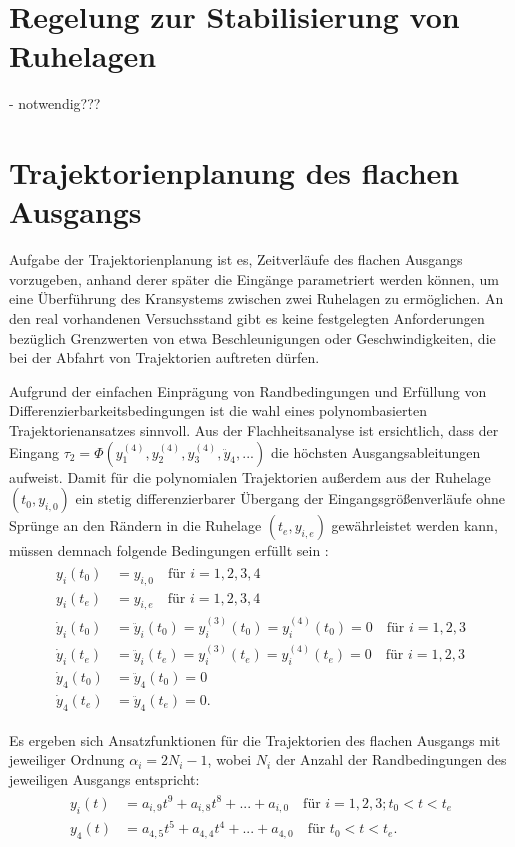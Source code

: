 \section{Regelung zur Stabilisierung von Ruhelagen}
- notwendig???

\section{Trajektorienplanung des flachen Ausgangs}
Aufgabe der Trajektorienplanung ist es, Zeitverläufe des flachen Ausgangs vorzugeben, anhand derer später die Eingänge parametriert werden können, um eine Überführung des Kransystems zwischen zwei Ruhelagen zu ermöglichen. An den real vorhandenen Versuchsstand gibt es keine festgelegten Anforderungen bezüglich Grenzwerten von etwa Beschleunigungen oder Geschwindigkeiten, die bei der Abfahrt von Trajektorien auftreten dürfen.

Aufgrund der einfachen Einprägung von Randbedingungen und Erfüllung von Differenzierbarkeitsbedingungen ist die wahl eines polynombasierten Trajektorienansatzes sinnvoll. Aus der Flachheitsanalyse ist ersichtlich, dass der Eingang $\tau_2 = \Phi(y_1^{(4)}, y_2^{(4)}, y_3^{(4)}, \ddot{y}_4, ...)$ die höchsten Ausgangsableitungen aufweist. Damit für die polynomialen Trajektorien außerdem aus der Ruhelage $(t_0, y_{i, 0})$  ein stetig differenzierbarer Übergang der Eingangsgrößenverläufe ohne Sprünge an den Rändern in die Ruhelage $(t_e, y_{i, e})$ gewährleistet werden kann, müssen demnach folgende Bedingungen erfüllt sein \cite[S. 230]{NLRT_Roebenack}:
\begin{align}
	\begin{split}
	y_i(t_0) &= y_{i, 0}  \quad \text{für } i = 1,2,3,4 \\
	y_i(t_e) &= y_{i, e}  \quad \text{für } i = 1,2,3,4 \\
	\dot{y}_i(t_0) &= \ddot{y}_i(t_0) = y_i^{(3)}(t_0) = y_i^{(4)}(t_0) = 0 \quad \text{für } i = 1,2,3 \\
	\dot{y}_i(t_e) &= \ddot{y}_i(t_e) = y_i^{(3)}(t_e) = y_i^{(4)}(t_e) = 0 \quad \text{für } i = 1,2,3 \\
	\dot{y}_4(t_0) &= \ddot{y}_4(t_0) = 0 \\
	\dot{y}_4(t_e) &= \ddot{y}_4(t_e) = 0.
	\end{split}
\end{align}

Es ergeben sich Ansatzfunktionen für die Trajektorien des flachen Ausgangs mit jeweiliger Ordnung $\alpha_i = 2 N_i - 1$, wobei $N_i$ der Anzahl der Randbedingungen des jeweiligen Ausgangs entspricht:
\begin{align}
	\begin{split}
	y_i(t) &= a_{i, 9} t^9 + a_{i, 8} t^8 + ... + a_{i, 0} \quad \text{für }  i = 1,2,3; t_0 < t < t_e \\
	y_4(t) &= a_{4, 5} t^5 + a_{4, 4} t^4 + ... + a_{4, 0} \quad \text{für } t_0 < t < t_e.
	\end{split}
\end{align}


